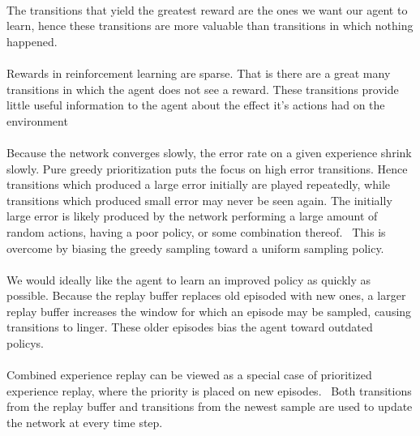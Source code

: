 \documentclass[letterpaper,twocolumn,10pt]{article}
\begin{document}
                \paragraph{}The transitions that yield the greatest reward are the ones we want our agent to learn, hence these transitions are more valuable than transitions in which nothing happened.~\cite{DBLP:journals/corr/SchaulQAS15}
                
                \paragraph{}Rewards in reinforcement learning are sparse. That is there are a great many transitions in which the agent does not see a reward. These transitions provide little useful information to the agent about the effect it's actions had on the environment~\cite{DBLP:journals/corr/SchaulQAS15}

                \paragraph{}Because the network converges slowly, the error rate on a given experience shrink slowly. Pure greedy prioritization puts the focus on high error transitions. Hence transitions which produced a large error initially are played repeatedly, while transitions which produced small error may never be seen again. The initially large error is likely produced by the network performing a large amount of random actions, having a poor policy, or some combination thereof.~\cite{DBLP:journals/corr/SchaulQAS15} This is overcome by biasing the greedy sampling toward a uniform sampling policy.

                \paragraph{}We would ideally like the agent to learn an improved policy as quickly as possible. Because the replay buffer replaces old episoded with new ones, a larger replay buffer increases the window for which an episode may be sampled, causing transitions to linger. These older episodes bias the agent toward outdated policys.~\cite{DBLP:journals/corr/abs-1712-01275}

                \paragraph{}Combined experience replay can be viewed as a special case of prioritized experience replay, where the priority is placed on new episodes.~\cite{DBLP:journals/corr/abs-1712-01275} Both transitions from the replay buffer and transitions from the newest sample are used to update the network at every time step.
\end{document}
